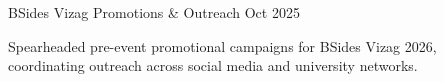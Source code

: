 \resumeProject
  {BSides Vizag}
  {Promotions \& Outreach}
  {Oct 2025}
  {{} }
\resumeItemListStart
  \item Spearheaded pre-event promotional campaigns for BSides Vizag 2026, coordinating outreach across social media and university networks.
\resumeItemListEnd
